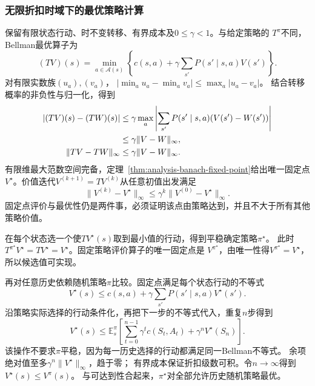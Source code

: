 \subsubsection{无限折扣时域下的最优策略计算}

保留有限状态行动、时不变转移、有界成本及$0\leq\gamma<1$。与给定策略的
$T^\pi$不同，Bellman最优算子为
\begin{equation}
  (TV)(s)=\min_{a\in\mathcal A(s)}
    \left\{c(s,a)+\gamma\sum_{s'}P(s'\mid s,a)V(s')\right\}.
  \label{eq:decision-discounted-bellman-operator}
\end{equation}
对有限实数族$(u_a),(v_a)$，
$|\min_a u_a-\min_a v_a|\leq\max_a|u_a-v_a|$。
结合转移概率的非负性与归一化，得到
\begin{align}
  |(TV)(s)-(TW)(s)|
  &\leq\gamma\max_a
    \left|\sum_{s'}P(s'\mid s,a)(V(s')-W(s'))\right|\notag\\
  &\leq\gamma\lVert V-W\rVert_\infty,
  \label{eq:decision-bellman-contraction-pointwise}\\
  \lVert TV-TW\rVert_\infty&\leq\gamma\lVert V-W\rVert_\infty.
  \label{eq:decision-bellman-contraction}
\end{align}
有限维最大范数空间完备，定理~\ref{thm:analysis-banach-fixed-point}给出唯一固定点
$V^\star$。价值迭代$V^{(k+1)}=TV^{(k)}$从任意初值出发满足
\begin{equation}
  \lVert V^{(k)}-V^\star\rVert_\infty
  \leq\gamma^k\lVert V^{(0)}-V^\star\rVert_\infty.
  \label{eq:decision-value-iteration-error}
\end{equation}
固定点评价与最优性仍是两件事，必须证明该点由策略达到，并且不大于所有其他策略价值。

在每个状态选一个使$TV^\star(s)$取到最小值的行动，得到平稳确定策略$\pi^\star$。
此时$T^{\pi^\star}V^\star=TV^\star=V^\star$。固定策略评价算子的唯一固定点是
$V^{\pi^\star}$，由唯一性得$V^{\pi^\star}=V^\star$，所以候选值可实现。

再对任意历史依赖随机策略$\pi$比较。固定点满足每个状态行动的不等式
\[
  V^\star(s)\leq c(s,a)+\gamma\sum_{s'}P(s'\mid s,a)V^\star(s').
\]
沿策略实际选择的行动条件化，再把下一步的不等式代入，重复$n$步得到
\begin{equation}
  V^\star(s)\leq\mathbb E_s^\pi
  \left[\sum_{t=0}^{n-1}\gamma^tc(S_t,A_t)+\gamma^nV^\star(S_n)\right].
  \label{eq:decision-discounted-all-policy-comparison}
\end{equation}
该操作不要求$\pi$平稳，因为每一历史选择的行动都满足同一Bellman不等式。
余项绝对值至多$\gamma^n\lVert V^\star\rVert_\infty$，趋于零；
有界成本保证折扣级数可积。令$n\to\infty$得到$V^\star(s)\leq V^\pi(s)$。
与可达到性合起来，$\pi^\star$对全部允许历史随机策略最优。


